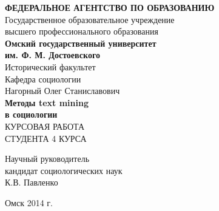 \begin{titlepage}

\begin{center}
{\bf ФЕДЕРАЛЬНОЕ АГЕНТСТВО ПО ОБРАЗОВАНИЮ}\\
\vspace{0.5cm}
Государственное образовательное учреждение\\
высшего профессионального образования\\
\textbf{Омский государственный университет\\
им. Ф. М. Достоевского\\}
\vspace{0.5cm}
Исторический факультет\\
Кафедра социологии\\
\vspace{3cm}
Нагорный Олег Станиславович\\
\vspace{2cm}
\textbf{\large Методы text mining\\в социологии\\}
\vspace{3cm}
КУРСОВАЯ РАБОТА\\
СТУДЕНТА 4 КУРСА\\
\vspace{3cm}
\end{center}

\begin{flushright}
Научный руководитель\\
кандидат социологических наук\\
К.В. Павленко\\
                                               
\vspace{4cm}

\begin{center}
Омск 2014 г.
\end{center}

\end{flushright}
\end{titlepage}